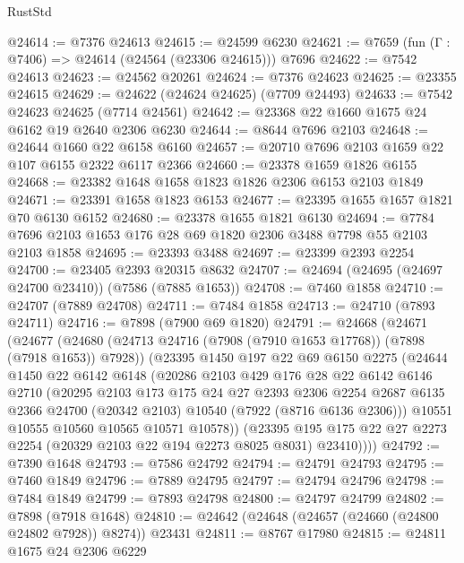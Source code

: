 \begin{lexlean}{RustStd}
\begin{coremodule}
@24614 := @7376 @24613
@24615 := @24599 @6230
@24621 := @7659 (fun (Γ : @7406) => @24614 (@24564 (@23306 @24615))) @7696
@24622 := @7542 @24613
@24623 := @24562 @20261
@24624 := @7376 @24623
@24625 := @23355 @24615
@24629 := @24622 (@24624 @24625) (@7709 @24493)
@24633 := @7542 @24623 @24625 (@7714 @24561)
@24642 := @23368 @22 @1660 @1675 @24 @6162 @19 @2640 @2306 @6230
@24644 := @8644 @7696 @2103
@24648 := @24644 @1660 @22 @6158 @6160
@24657 := @20710 @7696 @2103 @1659 @22 @107 @6155 @2322 @6117 @2366
@24660 := @23378 @1659 @1826 @6155
@24668 := @23382 @1648 @1658 @1823 @1826 @2306 @6153 @2103 @1849
@24671 := @23391 @1658 @1823 @6153
@24677 := @23395 @1655 @1657 @1821 @70 @6130 @6152
@24680 := @23378 @1655 @1821 @6130
@24694 := @7784 @7696 @2103 @1653 @176 @28 @69 @1820 @2306 @3488 @7798 @55 @2103 @2103 @1858
@24695 := @23393 @3488
@24697 := @23399 @2393 @2254
@24700 := @23405 @2393 @20315 @8632
@24707 := @24694 (@24695 (@24697 @24700 @23410)) (@7586 (@7885 @1653))
@24708 := @7460 @1858
@24710 := @24707 (@7889 @24708)
@24711 := @7484 @1858
@24713 := @24710 (@7893 @24711)
@24716 := @7898 (@7900 @69 @1820)
@24791 := @24668
    (@24671
      (@24677
        (@24680 (@24713 @24716 (@7908 (@7910 @1653 @17768)) (@7898 (@7918 @1653)) @7928))
        (@23395
          @1450
          @197
          @22
          @69
          @6150
          @2275
          (@24644
            @1450
            @22
            @6142
            @6148
            (@20286
              @2103
              @429
              @176
              @28
              @22
              @6142
              @6146
              @2710
              (@20295
                @2103
                @173
                @175
                @24
                @27
                @2393
                @2306
                @2254
                @2687
                @6135
                @2366
                @24700
                (@20342 @2103)
                @10540
                (@7922 (@8716 @6136 @2306)))
              @10551
              @10555
              @10560
              @10565
              @10571
              @10578))
          (@23395 @195 @175 @22 @27 @2273 @2254 (@20329 @2103 @22 @194 @2273 @8025 @8031) @23410))))
@24792 := @7390 @1648
@24793 := @7586 @24792
@24794 := @24791 @24793
@24795 := @7460 @1849
@24796 := @7889 @24795
@24797 := @24794 @24796
@24798 := @7484 @1849
@24799 := @7893 @24798
@24800 := @24797 @24799
@24802 := @7898 (@7918 @1648)
@24810 := @24642 (@24648 (@24657 (@24660 (@24800 @24802 @7928)) @8274)) @23431
@24811 := @8767 @17980
@24815 := @24811 @1675 @24 @2306 @6229

\end{coremodule}
\end{lexlean}
